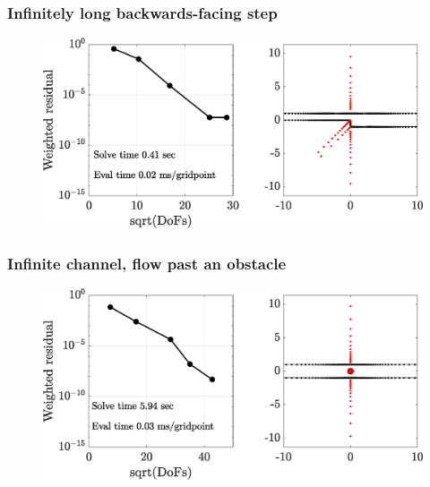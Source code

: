 \begin{frame}
\frametitle{Infinitely long backwards-facing step}
\centering
\begin{figure}
	\vfill
	\includegraphics[height=0.3\linewidth]{Figures/chan_conv}
\end{figure}
\end{frame}


\begin{frame}
\frametitle{Infinite channel, flow past an obstacle}
\centering
\begin{figure}

\includegraphics[height=0.3\linewidth]{Figures/cyl_conv}
\end{figure}
\end{frame}


